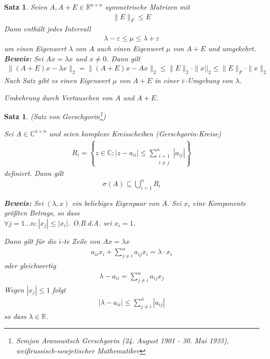 \documentclass[%
a4paper,
11pt,		%
]
{scrartcl}
\newcommand{\R}{\mathbb{R}}
\newcommand{\C}{\mathbb{C}}
\theoremstyle{plain}
\theoremstyle{plain}
\newtheorem{mysatz}[mydef]{Satz}
\theoremstyle{plain}
\theoremstyle{plain}
\begin{document}
\begin{mysatz}\label{satz:ewintervall}
Seien $A, A+E \in \R^{n \times n}$ symmetrische Matrizen mit
\begin{align*}
\| E \|_F \leq E
\end{align*}
Dann enthält jedes Intervall
\begin{align*}
\lambda - \varepsilon \leq \mu \leq \lambda + \varepsilon
\end{align*}
um einen Eigenwert $\lambda$ von $A$ auch einen Eigenwert $\mu$ von $A+E$ und umgekehrt.\\

\textbf{Beweis:} Sei $Ax=\lambda x$ und $x \neq 0$. Dann gilt
\begin{align*}
\| (A+E)x - \lambda x \|_2 = \| (A+E)x - Ax \|_2 \leq \|E\|_2 \cdot \|x||_2 \leq \|E\|_F \cdot \|x\|_2
\end{align*}
Nach Satz  gibt es einen Eigenwert $\mu$ von $A+E$ in einer $\varepsilon$-Umgebung von $\lambda$.

Umkehrung durch Vertauschen von $A$ und $A+E$.
\end{mysatz}

\begin{mysatz}(Satz von Gerschgorin\footnote{Semjon Aranowitsch Gerschgorin (24. August 1901 - 30. Mai 1933), weißrussisch-sowjetischer Mathematiker})

Sei $A \in \C^{n \times n}$ und seien komplexe Kreisscheiben \hfill (\textit{Gerschgorin-Kreise})
\begin{align*}
  R_i = \left\{ z \in \C; |z-a_{ii}| \leq \sum\limits_{\substack{i=1\\ i \neq j}}^n |a_{ij}| \right\}
\end{align*}
definiert. Dann gilt
\begin{align*}
\sigma(A) \subseteq \bigcup\limits_{i=1}^n R_i
\end{align*}

\textbf{Beweis:}
Sei $(\lambda,x)$ ein beliebiges Eigenpaar von $A$. Sei $x_i$ eine Komponente größten Betrags, so dass\\
$\forall j=1\dots n: |x_j| \leq |x_i| $. O.B.d.A. sei $x_i=1$.

Dann gilt für die $i$-te Zeile von $Ax = \lambda x$
\begin{align*}
  a_{ii} x_i + \sum\limits_{j \neq i}^n a_{ij} x_i = \lambda \cdot x_i
\end{align*}
oder gleichwertig
\begin{align*}
  \lambda - a_{ii} = \sum\limits_{j \neq i}^n a_{ij} x_j
\end{align*}
Wegen $|x_j| \leq 1$ folgt
\begin{align*}
  |\lambda - a_{ii}| \leq \sum\limits_{j \neq i}^n |a_{ij}|
\end{align*}
so dass $\lambda \in \R$.
\end{mysatz}
\end{document}
